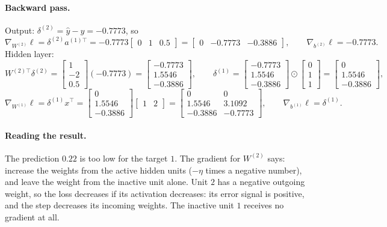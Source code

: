\begin{notechapter}
\paragraph{Backward pass.} Output: $\delta^{(2)} = \hat y - y = -0.7773$, so
\[
  \nabla_{W^{(2)}}\ell = \delta^{(2)}a^{(1)\top} = -0.7773\begin{bmatrix}0 & 1 & 0.5\end{bmatrix} = \begin{bmatrix}0 & -0.7773 & -0.3886\end{bmatrix},\qquad
  \nabla_{b^{(2)}}\ell = -0.7773 .
\]
Hidden layer:
\[
  W^{(2)\top}\delta^{(2)} = \begin{bmatrix}1\\-2\\0.5\end{bmatrix}(-0.7773) = \begin{bmatrix}-0.7773\\ 1.5546\\ -0.3886\end{bmatrix},\qquad
  \delta^{(1)} = \begin{bmatrix}-0.7773\\ 1.5546\\ -0.3886\end{bmatrix}\odot\begin{bmatrix}0\\1\\1\end{bmatrix} = \begin{bmatrix}0\\ 1.5546\\ -0.3886\end{bmatrix},
\]
\[
  \nabla_{W^{(1)}}\ell = \delta^{(1)}x^\top = \begin{bmatrix}0\\ 1.5546\\ -0.3886\end{bmatrix}\begin{bmatrix}1 & 2\end{bmatrix}
  = \begin{bmatrix}0 & 0\\ 1.5546 & 3.1092\\ -0.3886 & -0.7773\end{bmatrix},\qquad\nabla_{b^{(1)}}\ell = \delta^{(1)} .
\]

\paragraph{Reading the result.} The prediction $0.22$ is too low for the target $1$. The gradient
for $W^{(2)}$ says: increase the weights from the active hidden units ($-\eta$ times a negative
number), and leave the weight from the inactive unit alone. Unit $2$ has a negative outgoing
weight, so the loss decreases if its activation decreases: its error signal is positive, and
the step decreases its incoming weights. The inactive unit $1$ receives no gradient at all.


\end{notechapter}
